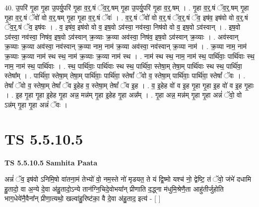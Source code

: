 \documentclass[17pt]{extarticle}
\begin{document}
40. उ॒परि॑ गृ॒हा गृ॒हा उ॒पर्यु॒परि॑ गृ॒हा व॒र्॒.षं ॅव॒र्॒.षम् गृ॒हा उ॒पर्यु॒परि॑ गृ॒हा व॒र्॒.षम् । . गृ॒हा व॒र्॒.षं ॅव॒र्॒.षम् गृ॒हा गृ॒हा व॒र्॒.षं ॅवो॑ वो व॒र्॒.षम् गृ॒हा गृ॒हा व॒र्॒.षं ॅवः॑ । . व॒र्॒.षं ॅवो॑ वो व॒र्॒.षं ॅव॒र्॒.षं ॅव॒ इष॑व॒ इष॑वो वो व॒र्॒.षं ॅव॒र्॒.षं ॅव॒ इष॑वः । . व॒ इष॑व॒ इष॑वो वो व॒ इष॒वो ऽव॑स्वा॒ नव॑स्वा॒ निष॑वो वो व॒ इष॒वो ऽव॑स्वान् । . इष॒वो ऽव॑स्वा॒ नव॑स्वा॒ निष॑व॒ इष॒वो ऽव॑स्वान् क्र॒व्याः क्र॒व्या अव॑स्वा॒ निष॑व॒ इष॒वो ऽव॑स्वान् क्र॒व्याः । . अव॑स्वान् क्र॒व्याः क्र॒व्या अव॑स्वा॒ नव॑स्वान् क्र॒व्या नाम॒ नाम॑ क्र॒व्या अव॑स्वा॒ नव॑स्वान् क्र॒व्या नाम॑ । . क्र॒व्या नाम॒ नाम॑ क्र॒व्याः क्र॒व्या नाम॑ स्थ स्थ॒ नाम॑ क्र॒व्याः क्र॒व्या नाम॑ स्थ । . नाम॑ स्थ स्थ॒ नाम॒ नाम॑ स्थ॒ पार्थि॑वाः॒ पार्थि॑वाः स्थ॒ नाम॒ नाम॑ स्थ॒ पार्थि॑वाः । . स्थ॒ पार्थि॑वाः॒ पार्थि॑वाः स्थ स्थ॒ पार्थि॑वा॒ स्तेषा॒म् तेषा॒म् पार्थि॑वाः स्थ स्थ॒ पार्थि॑वा॒ स्तेषा᳚म् । . पार्थि॑वा॒ स्तेषा॒म् तेषा॒म् पार्थि॑वाः॒ पार्थि॑वा॒ स्तेषां᳚ ॅवो व॒ स्तेषा॒म् पार्थि॑वाः॒ पार्थि॑वा॒ स्तेषां᳚ ॅवः । . तेषां᳚ ॅवो व॒ स्तेषा॒म् तेषां᳚ ॅव इ॒हेह व॒ स्तेषा॒म् तेषां᳚ ॅव इ॒ह । . व॒ इ॒हेह वो॑ व इ॒ह गृ॒हा गृ॒हा इ॒ह वो॑ व इ॒ह गृ॒हाः । . इ॒ह गृ॒हा गृ॒हा इ॒हेह गृ॒हा अन्न॒ मन्न॑म् गृ॒हा इ॒हेह गृ॒हा अन्न᳚म् । . गृ॒हा अन्न॒ मन्न॑म् गृ॒हा गृ॒हा अन्नं॑ ॅवो॒ वो ऽन्न॑म् गृ॒हा गृ॒हा अन्नं॑ ॅवः । \newline
\pagebreak
{}

\section{ TS 5.5.10.5 }

\textbf{TS 5.5.10.5 } \newline
\textbf{Samhita Paata} \newline

अन्नं॑ ॅव॒ इष॑वो ऽनिमि॒षो वा॑तना॒मं तेभ्यो॑ वो॒ नम॒स्ते नो॑ मृडयत॒ ते यं द्वि॒ष्मो यश्च॑ नो॒ द्वेष्टि॒ तं ॅवो॒ जंभे॑ दधामि हु॒तादो॒ वा अ॒न्ये दे॒वा अ॑हु॒तादो॒ऽन्ये तान॑ग्नि॒चिदे॒वोभया᳚न् प्रीणाति द॒द्ध्ना म॑धुमि॒श्रेणै॒ता आहु॑तीर्जुहोति भाग॒धेये॑नै॒वैना᳚न् प्रीणा॒त्यथो॒ खल्वा॑हु॒रिष्ट॑का॒ वै दे॒वा अ॑हु॒ताद॒ इत्य॑ - [  ] \newline
\end{document}
